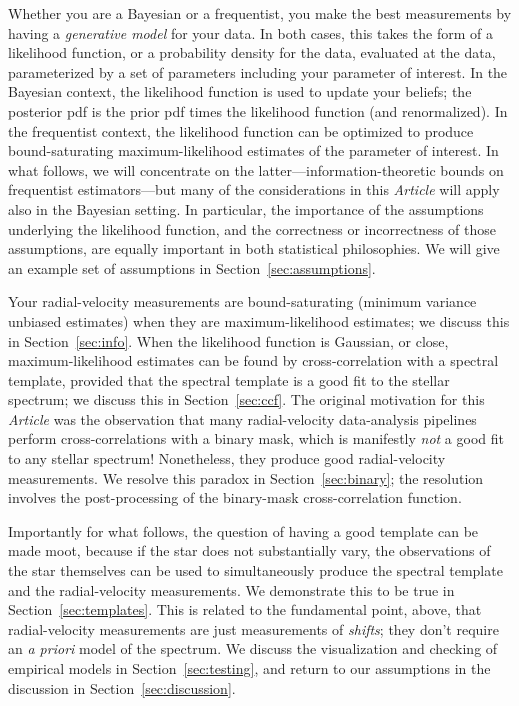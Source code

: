 \documentclass[modern]{aastex631}
\newcommand{\documentname}{\textsl{Article}}
\newcommand{\sectionname}{Section}
\newcommand{\secref}[1]{\sectionname~\ref{#1}}
\newcommand{\foreign}[1]{\textsl{#1}}
\begin{document}
Whether you are a Bayesian or a frequentist, you make the best measurements by having a \emph{generative model} for your data.
In both cases, this takes the form of a likelihood function, or a probability density for the data, evaluated at the data, parameterized by a set of parameters including your parameter of interest.
In the Bayesian context, the likelihood function is used to update your beliefs; the posterior pdf is the prior pdf times the likelihood function (and renormalized).
In the frequentist context, the likelihood function can be optimized to produce bound-saturating maximum-likelihood estimates of the parameter of interest.
In what follows, we will concentrate on the latter---information-theoretic bounds on frequentist estimators---but many of the considerations in this \documentname{} will apply also in the Bayesian setting.
In particular, the importance of the assumptions underlying the likelihood function, and the correctness or incorrectness of those assumptions, are equally important in both statistical philosophies.
We will give an example set of assumptions in \secref{sec:assumptions}.

Your radial-velocity measurements are bound-saturating (minimum variance unbiased estimates) when they are maximum-likelihood estimates; we discuss this in \secref{sec:info}.
When the likelihood function is Gaussian, or close, maximum-likelihood estimates can be found by cross-correlation with a spectral template, provided that the spectral template is a good fit to the stellar spectrum; we discuss this in \secref{sec:ccf}.
The original motivation for this \documentname{} was the observation that many radial-velocity data-analysis pipelines perform cross-correlations with a binary mask, which is manifestly \emph{not} a good fit to any stellar spectrum!
Nonetheless, they produce good radial-velocity measurements.
We resolve this paradox in \secref{sec:binary}; the resolution involves the post-processing of the binary-mask cross-correlation function.

Importantly for what follows, the question of having a good template can be made moot, because if the star does not substantially vary, the observations of the star themselves can be used to simultaneously produce the spectral template and the radial-velocity measurements.
We demonstrate this to be true in \secref{sec:templates}.
This is related to the fundamental point, above, that radial-velocity measurements are just measurements of \emph{shifts}; they don't require an \foreign{a priori} model of the spectrum.
We discuss the visualization and checking of empirical models in \secref{sec:testing}, and return to our assumptions in the discussion in \secref{sec:discussion}.
\end{document}

